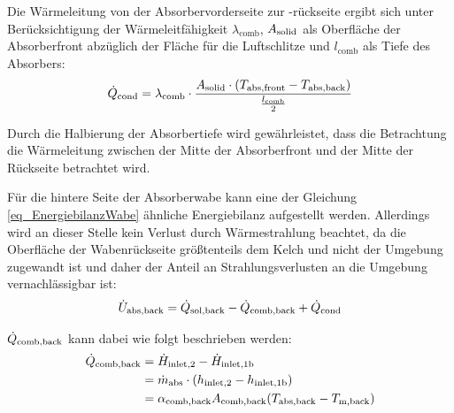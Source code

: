 Die Wärmeleitung von der Absorbervorderseite zur -rückseite ergibt sich unter Berücksichtigung der Wärmeleitfähigkeit $\lambda_{\mathrm{comb}}$, $A_{\mathrm{solid}}$ als Oberfläche der Absorberfront abzüglich der Fläche für die Luftschlitze und $l_{\mathrm{comb}}$ als Tiefe des Absorbers:
\begin{equation} \label{eq_WärmeleitungVorneHinten}
\dot{Q}_{\mathrm{cond}} = \lambda_{\mathrm{comb}} \cdot \frac{A_{\mathrm{solid}} \cdot (T_{\mathrm{abs,front}}-T_{\mathrm{abs,back}})}{\frac{l_{\mathrm{comb}}}{2}}
\end{equation}

\vspace*{-\baselineskip}Durch die Halbierung der Absorbertiefe wird gewährleistet, dass die Betrachtung die Wärmeleitung zwischen der Mitte der Absorberfront und der Mitte der Rückseite betrachtet wird.

Für die hintere Seite der Absorberwabe kann eine der Gleichung \ref{eq_EnergiebilanzWabe} ähnliche Energiebilanz aufgestellt werden.
Allerdings wird an dieser Stelle kein Verlust durch Wärmestrahlung beachtet, da die Oberfläche der Wabenrückseite größtenteils dem Kelch und nicht der Umgebung zugewandt ist und daher der Anteil an Strahlungsverlusten an die Umgebung vernachlässigbar ist:
\begin{equation} \label{eq_EnergiebilanzWabeHinten}
    \dot{U}_{\mathrm{abs}, \mathrm{back}} =\dot{Q}_{\mathrm{sol,back}} -\dot{Q}_{\mathrm{comb,back}} + \dot{Q}_{\mathrm{cond}}
\end{equation}

$\dot{Q}_{\mathrm{comb,back}}$ kann dabei wie folgt beschrieben werden:
\begin{equation} \label{eq_KonvektionWabeHinten}
    \begin{aligned}
        \dot{Q}_{\mathrm{comb,back}} & = \dot{H}_{\mathrm{inlet,}2} - \dot{H}_{\mathrm{inlet,}\mathrm{1b}}                                          \\
                              & = \dot{m}_{\mathrm{abs}} \cdot ( h_{\mathrm{inlet,}2} - h_{\mathrm{inlet,}\mathrm{1b}})        \\
                              & = \alpha_{\mathrm{comb},\mathrm{back}} A_{\mathrm{comb},\mathrm{back}} (T_{\mathrm{abs,back}}-T_{\mathrm{m,back}})
    \end{aligned}
\end{equation}

